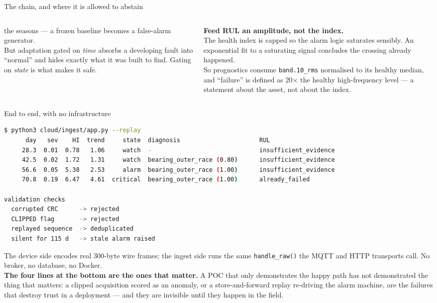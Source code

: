 \documentclass[aspectratio=169,10pt]{beamer}
\begin{document}
\begin{frame}{The chain, and where it is allowed to abstain}
\begin{columns}[T]
\begin{column}{0.32\textwidth}
      the seasons --- a frozen baseline becomes a false-alarm generator.
      \\[1mm]
      But adaptation gated on \emph{time} absorbs a developing fault into
      ``normal'' and hides exactly what it was built to find. Gating on
      \emph{state} is what makes it safe.
    \end{column}
    \begin{column}{0.32\textwidth}
      \scriptsize
      \textbf{Feed RUL an amplitude, not the index.}\\
      The health index is capped so the alarm logic saturates sensibly. An
      exponential fit to a saturating signal concludes the crossing already
      happened.
      \\[1mm]
      So prognostics consume \texttt{band.10\_rms} normalised to its healthy
      median, and ``failure'' is defined as 20$\times$ the healthy
      high-frequency level --- a statement about the asset, not about the index.
    \end{column}
  \end{columns}
\end{frame}

\begin{frame}[fragile]{End to end, with no infrastructure}
\begin{lstlisting}[language=bash]
$ python3 cloud/ingest/app.py --replay
      day   sev    HI  trend     state  diagnosis                      RUL
     28.3  0.01  0.78   1.06     watch  -                              insufficient_evidence
     42.5  0.02  1.72   1.31     watch  bearing_outer_race (0.80)      insufficient_evidence
     56.6  0.05  5.38   2.53     alarm  bearing_outer_race (1.00)      insufficient_evidence
     70.8  0.19  6.47   4.61  critical  bearing_outer_race (1.00)      already_failed

validation checks
  corrupted CRC      -> rejected
  CLIPPED flag       -> rejected
  replayed sequence  -> deduplicated
  silent for 115 d   -> stale alarm raised
\end{lstlisting}
  \scriptsize
  The device side encodes real 300-byte wire frames; the ingest side runs the
  same \texttt{handle\_raw()} the MQTT and HTTP transports call. No broker, no
  database, no Docker.
  \\[2mm]
  \textbf{The four lines at the bottom are the ones that matter.} A POC that
  only demonstrates the happy path has not demonstrated the thing that matters:
  a clipped acquisition scored as an anomaly, or a store-and-forward replay
  re-driving the alarm machine, are the failures that destroy trust in a
  deployment --- and they are invisible until they happen in the field.
\end{frame}
\end{document}
